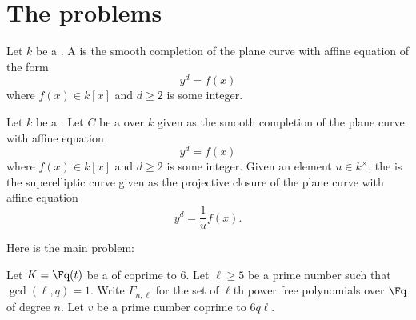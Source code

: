 

\nocite{*}

\section{The problems}

\begin{definition} \label{definition:superelliptic_curve_over_a_field}
    Let $k$ be a . 
    A  is the smooth completion of the plane curve with affine equation of the form 
    $$y^d = f(x)$$
    where $f(x) \in k[x]$ and $d \geq 2$ is some integer.
\end{definition}

\begin{definition} \label{definition:mu_d_twist_of_a_superelliptic_curve_by_a_scalar}
    Let $k$ be a . Let $C$ be a  over $k$ given as the smooth completion of the plane curve with affine equation 
    $$y^d = f(x)$$
    where $f(x) \in k[x]$ and $d \geq 2$ is some integer.
    Given an element $u \in k^\times$, the  is the superelliptic curve given as the projective closure of the plane curve with affine equation
    $$y^d = \frac{1}{u} f(x).$$
\end{definition}

Here is the main problem:

\begin{context} \label{context:main_context_for_average_dimensions_of_selmer_groups_of_twists_of_superelliptic_curve_over_global_function_field}
    Let $K = \Fq(t)$ be a  of  coprime to $6$. Let $\ell \geq 5$ be a prime number such that $\gcd(\ell, q) = 1$. Write $F_{n,\ell}$ for the set of $\ell$th power free polynomials over $\Fq$ of degree $n$. Let $v$ be a prime number coprime to $6 q \ell$. 
\end{context}

